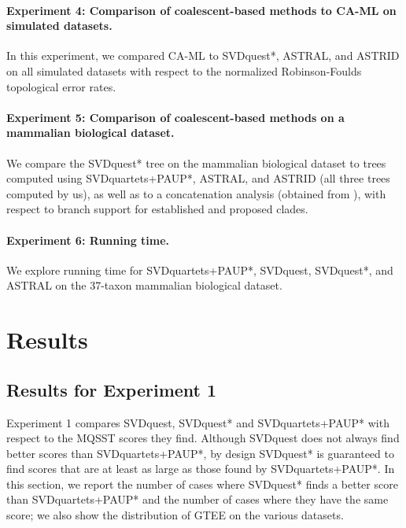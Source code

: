 \paragraph{Experiment 4: Comparison of coalescent-based methods to CA-ML on simulated datasets. }

In this experiment, we compared CA-ML to SVDquest*, ASTRAL, and ASTRID
on all simulated datasets with respect to the normalized
Robinson-Foulds  topological error rates.

\paragraph{Experiment 5: Comparison of coalescent-based methods on a mammalian biological dataset. }

We compare the SVDquest* tree 
on the mammalian biological
dataset to trees computed using SVDquartets+PAUP*,
ASTRAL, and ASTRID (all three trees
computed by us), as well as to a concatenation
analysis (obtained from \cite{astral}),  with respect to
branch support for established and proposed clades.



\paragraph{Experiment 6: Running time. }
We explore running time for SVDquartets+PAUP*, SVDquest, SVDquest*, and ASTRAL
on the 37-taxon mammalian biological dataset.




\section{Results}


\subsection{Results for Experiment 1}


Experiment 1 compares SVDquest, SVDquest* and SVDquartets+PAUP* with respect to  the MQSST scores they find.
Although SVDquest does not always find better scores than SVDquartets+PAUP*,
by design SVDquest* is guaranteed to find scores that are at least as large as those
found by SVDquartets+PAUP*.
In this section, we report the number of cases where SVDquest* finds a better score than SVDquartets+PAUP* and
the number of cases where they have the same score; we also
show the distribution of GTEE on the various datasets.


